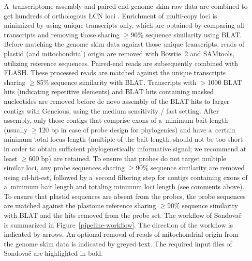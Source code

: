 \documentclass[a4paper, 11pt, twoside]{article}
\begin{document}
A~transcriptome assembly and paired-end genome skim raw data are combined to get hundreds of orthologous LCN loci \citep{Schmickl2016}. Enrichment of multi-copy loci is minimized by using unique transcripts only, which are obtained by comparing all transcripts and removing those sharing $\geq$90\% sequence similarity using BLAT. Before matching the genome skim data against those unique transcripts, reads of plastid (and mitochondrial) origin are removed with Bowtie~2 and SAMtools, utilizing reference sequences. Paired-end reads are subsequently combined with FLASH. These processed reads are matched against the unique transcripts sharing $\geq$85\% sequence similarity with BLAT. Transcripts with $>$1000 BLAT hits (indicating repetitive elements) and BLAT hits containing masked nucleotides are removed before de novo assembly of the BLAT hits to larger contigs with Geneious, using the medium sensitivity / fast setting. After assembly, only those contigs that comprise exons of a~minimum bait length (usually $\geq$120 bp in case of probe design for phylogenies) and have a~certain minimum total locus length (multiple of the bait length, should not be too short in order to obtain sufficient phylogenetically informative signal; we recommend at least $\geq$600 bp) are retained. To ensure that probes do not target multiple similar loci, any probe sequences sharing $\geq$90\% sequence similarity are removed using cd-hit-est, followed by a~second filtering step for contigs containing exons of a~minimum bait length and totaling minimum loci length (see comments above). To ensure that plastid sequences are absent from the probes, the probe sequences are matched against the plastome reference sharing $\geq$90\% sequence similarity with BLAT and the hits removed from the probe set. The workflow of Sondovač is summarized in Figure~\ref{pipeline-workflow}. The direction of the workflow is indicated by arrows. An optional removal of reads of mitochondrial origin from the genome skim data is indicated by greyed text. The required input files of Sondovač are highlighted in bold.
\end{document}
